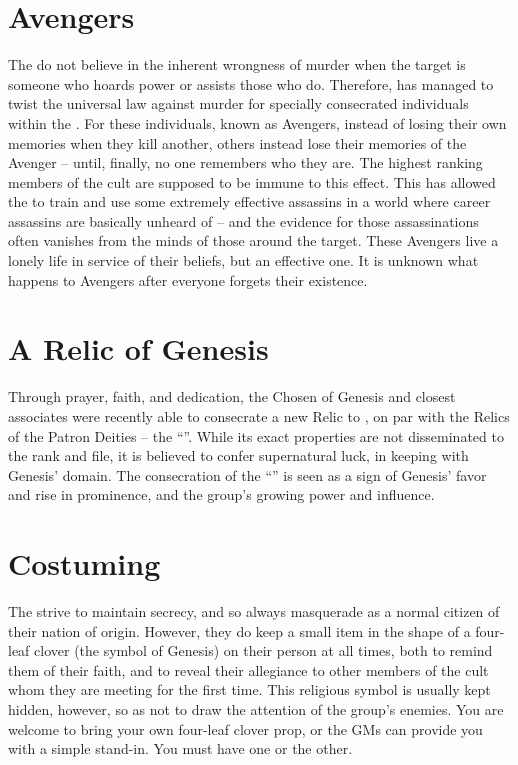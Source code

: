 \documentclass[blue]{GL2020}
\begin{document}
\section*{Avengers}
The \pGoaties{} do not believe in the inherent wrongness of murder when the target is someone who hoards power or assists those who do. Therefore, \cGenesis{} has managed to twist the universal law against murder for specially consecrated individuals within the \pGoaties{}. For these individuals, known as Avengers, instead of losing their own memories when they kill another, others instead lose their memories of the Avenger -- until, finally, no one remembers who they are. The highest ranking members of the cult are supposed to be immune to this effect. This has allowed the \pGoaties{} to train and use some extremely effective assassins in a world where career assassins are basically unheard of -- and the evidence for those assassinations often vanishes from the minds of those around the target. These Avengers live a lonely life in service of their beliefs, but an effective one. It is unknown what happens to Avengers after everyone forgets their existence.

\section*{A Relic of Genesis}
Through prayer, faith, and dedication, the Chosen of Genesis and \cChupLeader{\their} closest associates were recently able to consecrate a new Relic to \cGenesis{}, on par with the Relics of the Patron Deities – the ``\iHorseshoe{}''. While its exact properties are not disseminated to the rank and file, it is believed to confer supernatural luck, in keeping with Genesis' domain. The consecration of the ``\iHorseshoe{}'' is seen as a sign of Genesis' favor and rise in prominence, and the group's growing power and influence.

\section*{Costuming}
The \pGoaties{} strive to maintain secrecy, and so always masquerade as a normal citizen of their nation of origin. However, they do keep a small item in the shape of a four-leaf clover (the symbol of Genesis) on their person at all times, both to remind them of their faith, and to reveal their allegiance to other members of the cult whom they are meeting for the first time. This religious symbol is usually kept hidden, however, so as not to draw the attention of the group's enemies. You are welcome to bring your own four-leaf clover prop, or the GMs can provide you with a simple stand-in. You must have one or the other.
\end{document}
